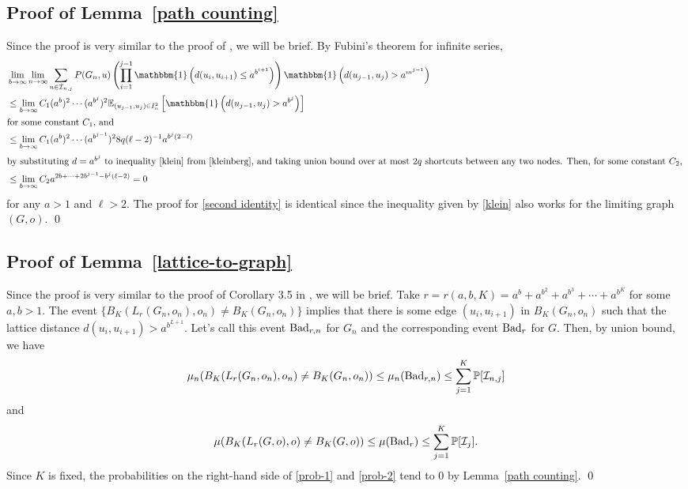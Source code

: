 \documentclass[10pt]{amsart}
\begin{document}
\subsection*{Proof of Lemma~\ref{path counting}} \label{path counting proof}

Since the proof is very similar to the proof of \cite[Lemma 3.3]{van2021local}, we will be brief. By Fubini's theorem for infinite series,
\begin{align*}
&\lim_{b \to \infty} \lim_{n \to \infty} \sum_{u \in \mathcal{I}_{n,j}} P(G_n, u) \left( \prod_{i=1}^{j-1} \mathbbm{1} \left( d(u_i, u_{i+1}) \leq a^{b^{i+1}} \right) \right)
\mathbbm{1} \left( d(u_{j-1}, u_j) > a^{m^{j-1}} \right) \\
& \leq  \lim_{b \to \infty} C_1 (a^b)^2 \cdots (a^{b^{j}})^2 \mathbb{E}_{(u_{j-1}, u_j) \in I_n^{2}} \left[\mathbbm{1} \left( d(u_{j-1}, u_j) > a^{b^j} \right) \right]\\
\intertext{for some constant $C_1$, and}
&\leq \lim_{b \to \infty} C_1 (a^b)^2 \cdots (a^{b^{j-1}})^2  8q (\ell-2)^{-1} a^{b^j (2-\ell)} \\
\intertext{by substituting $d = a^{b^j}$ to inequality \eqref{klein} from \cite{kleinberg}, and taking union bound over at most $2q$ shortcuts between any two nodes. Then, for some constant $C_2$, }
&\leq \lim_{b \to \infty} C_2 a^{2b + \cdots + 2b^{j-1} - b^j(\ell -2)} = 0
\end{align*}
for any $a > 1$ and $\ell > 2$. The proof for \eqref{second identity} is identical since the inequality given by \eqref{klein} also works for the limiting graph $(G, o)$. \qed

\subsection*{Proof of Lemma~\ref{lattice-to-graph}} 

\label{coupling proof}
Since the proof is very similar to the proof of Corollary 3.5 in \cite{van2021local}, we will be brief. Take $r = r(a,b,K) = a^b + a^{b^2} + a^{b^3} + \cdots + a^{b^K}$ for some $a, b > 1$. The event $\{B_K(L_r(G_n, o_n), o_n) \neq B_K(G_n, o_n)\}$ implies that there is some edge $(u_i,  u_{i+1})$ in $B_K(G_n, o_n)$ such that the lattice distance $d(u_i,  u_{i+1}) > a^{b^{L+1}}$. Let's call this event $\text{\textbf{Bad}}_{r, n}$ for $G_n$ and the corresponding event $\text{\textbf{Bad}}_{r}$ for $G$. Then, by union bound, we have
 \begin{equation} \label{prob-1}
     \mu_n(B_K(L_r(G_n, o_n), o_n) \neq B_K(G_n, o_n)) \leq \mu_n(\text{\textbf{Bad}}_{r, n}) \leq \sum_{j=1}^K \mathbb{P}[\mathcal{I}_{n,j}]
 \end{equation} and 
 \begin{equation} \label{prob-2}
     \mu(B_K(L_r(G, o), o) \neq B_K(G, o)) \leq \mu(\text{\textbf{Bad}}_{r}) \leq \sum_{j=1}^K \mathbb{P}[\mathcal{I}_{j}].
 \end{equation}
Since $K$ is fixed, the probabilities on the right-hand side of \eqref{prob-1} and \eqref{prob-2} tend to $0$ by Lemma~\ref{path counting}. \qed
\end{document}
